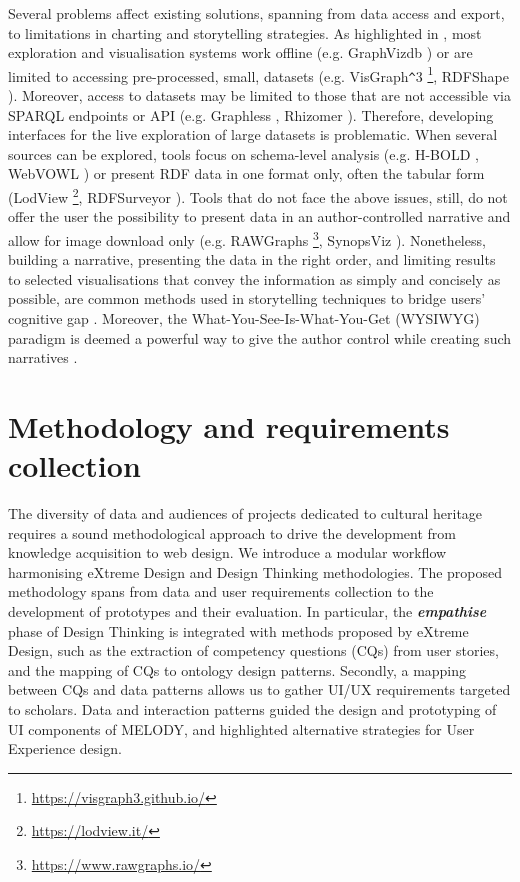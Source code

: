 \documentclass[manuscript]
{acmart}
\begin{document}
Several problems affect existing solutions, spanning from data access and export, to limitations in charting and storytelling strategies. As highlighted in \cite{bikakis_exploration_2016}, most exploration and visualisation systems work offline (e.g. GraphVizdb \cite{bikakis_graphvizdb_2016}) or are limited to accessing pre-processed, small, datasets (e.g. VisGraph\verb|^|3 \footnote{\url{https://visgraph3.github.io/}}, RDFShape \cite{gayo_rdfshape_2018}). Moreover, access to datasets may be limited to those that are not accessible via SPARQL endpoints or API (e.g. Graphless \cite{santana-perez_graphless_2018}, Rhizomer \cite{brunetti_overview_2013}). Therefore, developing interfaces for the live exploration of large datasets is problematic. When several sources can be explored, tools focus on schema-level analysis (e.g. H-BOLD \cite{po_high-level_2018}, WebVOWL \cite{lohmann_webvowl_2015}) or present RDF data in one format only, often the tabular form (LodView \footnote{\url{https://lodview.it/}}, RDFSurveyor \cite{vega-gorgojo_linked_2019}). Tools that do not face the above issues, still, do not offer the user the possibility to present data in an author-controlled narrative and allow for image download only (e.g. RAWGraphs \footnote{\url{https://www.rawgraphs.io/}}, SynopsViz \cite{bikakis_rdfsynopsviz_2017}). Nonetheless, building a narrative, presenting the data in the right order, and limiting results to selected visualisations that convey the information as simply and concisely as possible, are common methods used in storytelling techniques to bridge users’ cognitive gap \cite{stackpole_next_2020}. Moreover, the What-You-See-Is-What-You-Get (WYSIWYG) paradigm is deemed a powerful way to give the author control while creating such narratives \cite{khalili_rdfa_2012}.

\section{Methodology and requirements collection} \label{methodology}
The diversity of data and audiences of projects dedicated to cultural heritage requires a sound methodological approach to drive the development from knowledge acquisition to web design. We introduce a modular workflow harmonising eXtreme Design and Design Thinking methodologies. The proposed methodology spans from data and user requirements collection to the development of prototypes and their evaluation. In particular, the \textbf{\textit{empathise}} phase of Design Thinking is integrated with methods proposed by eXtreme Design, such as the extraction of competency questions (CQs) from user stories, and the mapping of CQs to ontology design patterns. Secondly, a mapping between CQs and data patterns allows us to gather UI/UX requirements targeted to scholars. Data and interaction patterns guided the design and prototyping of UI components of MELODY, and highlighted alternative strategies for User Experience design.
\end{document}
